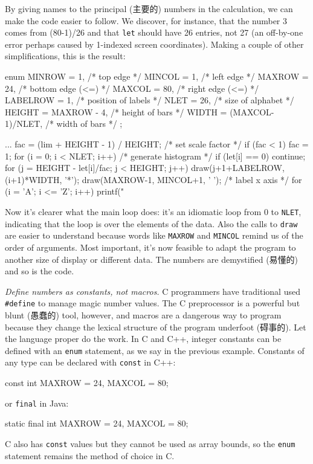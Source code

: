 By giving names to the principal (主要的) numbers in the calculation, we
can make the code easier to follow. We discover, for instance, that the
number 3 comes from (80-1)/26 and that \verb'let' should have 26 entries,
not 27 (an off-by-one error perhaps caused by 1-indexed screen
coordinates). Making a couple of other simplifications, this is the result:
\begin{wellcode}
    enum {
        MINROW  = 1,                        /* top edge */
        MINCOL  = 1,                        /* left edge */
        MAXROW  = 24,                       /* bottom edge (<=) */
        MAXCOL  = 80,                       /* right edge (<=) */
        LABELROW = 1,                       /* position of labels */
        NLET    = 26,                       /* size of alphabet */
        HEIGHT  = MAXROW - 4,               /* height of bars */
        WIDTH   = (MAXCOL-1)/NLET,          /* width of bars */
    };

    ...
    fac = (lim + HEIGHT - 1) / HEIGHT;  /* set scale factor */
    if (fac < 1)
        fac = 1;
    for (i = 0; i < NLET; i++) { /* generate histogram */
        if (let[i] == 0)
            continue;
        for (j = HEIGHT - let[i]/fac; j < HEIGHT; j++)
            draw(j+1+LABELROW, (i+1)*WIDTH, '*');
    }
    draw(MAXROW-1, MINCOL+1, ' '); /* label x axis */
    for (i = 'A'; i <= 'Z'; i++)
        printf("%
\end{wellcode}
Now it's clearer what the main loop does: it's an idiomatic loop from 0 to
\verb'NLET', indicating that the loop is over the elements of the data.
Also the calls to \verb'draw' are easier to understand because words like
\verb'MAXROW' and \verb'MINCOL' remind us of the order of arguments. Most
important, it's now feasible to adapt the program to another size of
display or different data. The numbers are demystified (易懂的) and so is
the code.

\emph{Define numbers as constants, not macros.} C programmers have
traditional used \verb'#define' to manage magic number values. The C
preprocessor is a powerful but blunt (愚蠢的) tool, however, and macros are
a dangerous way to program because they change the lexical structure of the
program underfoot (碍事的). Let the language proper do the work. In C and
C++, integer constants can be defined with an \verb'enum' statement, as we
say in the previous example. Constants of any type can be declared with
\verb'const' in C++:
\begin{wellcode}
    const int MAXROW = 24, MAXCOL = 80;
\end{wellcode}
or \verb'final' in Java:
\begin{wellcode}
    static final int MAXROW = 24, MAXCOL = 80;
\end{wellcode}
C also has \verb'const' values but they cannot be used as array bounds, so
the \verb'enum' statement remains the method of choice in C.

